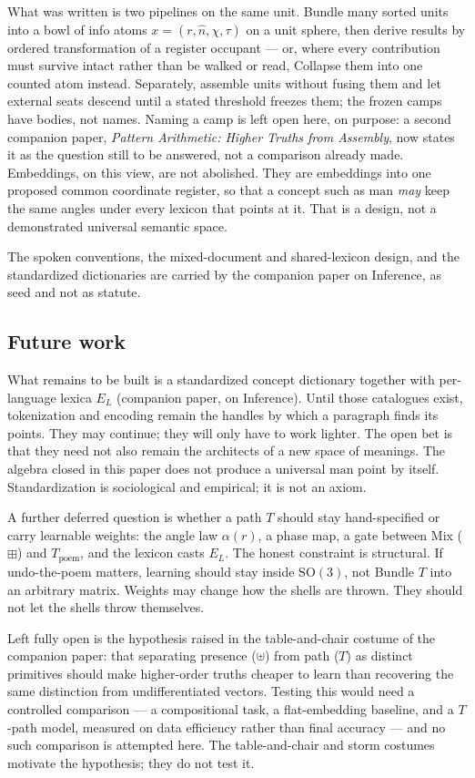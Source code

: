 \documentclass[12pt, a4paper]{article}
\begin{document}
What was written is two pipelines on the same unit. Bundle many
sorted units into a bowl of info atoms $x=(r,\hat n,\chi,\tau)$ on a
unit sphere, then derive results by ordered transformation of a
register occupant --- or, where every contribution must survive
intact rather than be walked or read, Collapse them into one counted
atom instead. Separately, assemble units without fusing them
and let external seats descend until a stated threshold freezes
them; the frozen camps have bodies, not names. Naming a camp is
left open here, on purpose: a second companion paper,
\emph{Pattern Arithmetic: Higher Truths from Assembly}, now states
it as the question still to be answered, not a comparison already
made.
Embeddings, on this view, are
not abolished. They are embeddings into one proposed common coordinate
register, so that a
concept such as $\mathrm{man}$ \emph{may} keep the same angles under every
lexicon that points at it. That is a design, not a demonstrated
universal semantic space.

The spoken conventions, the mixed-document and shared-lexicon design, and the standardized dictionaries are carried by the companion paper on Inference, as seed and not as statute.

\subsection{Future work}
\label{subsec:future_work}
What remains to be built is a standardized
concept dictionary together with per-language lexica $E_L$
(companion paper, on Inference). Until those catalogues
exist, tokenization and encoding remain the handles by which a
paragraph finds its points. They may continue; they will only have to
work lighter. The open bet is that they need not also
remain the architects of a new space of meanings.
The algebra closed in this paper does not produce a universal
$\mathrm{man}$ point by itself. Standardization is sociological and
empirical; it is not an axiom.

A further deferred question is whether a path $T$ should stay
hand-specified or carry learnable weights: the angle law
$\alpha(r)$, a phase map, a gate between Mix ($\boxplus$) and
$T_{\mathrm{poem}}$, and the lexicon casts $E_L$. The honest
constraint is structural. If undo-the-poem matters, learning should
stay inside $\mathrm{SO}(3)$, not Bundle $T$ into an arbitrary
matrix. Weights may change how the shells are thrown. They should
not let the shells throw themselves.

Left fully open is the hypothesis raised in the table-and-chair costume of the companion paper: that separating presence
($\uplus$) from path ($T$) as distinct primitives should make
higher-order truths cheaper to learn than recovering the same
distinction from undifferentiated vectors. Testing this would need a
controlled comparison --- a compositional task, a flat-embedding
baseline, and a $T$-path model, measured on data efficiency rather
than final accuracy --- and no such comparison is attempted here.
The table-and-chair and storm costumes motivate the hypothesis; they
do not test it.
\end{document}
